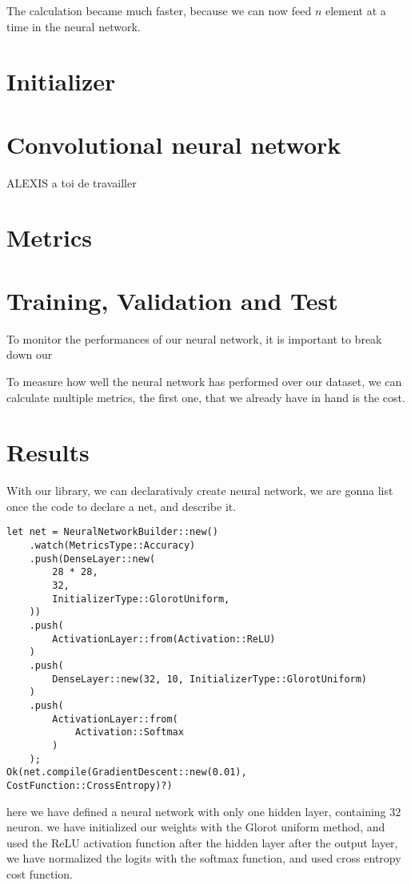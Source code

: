 \documentclass[a4paper, twocolumn, twoside]{article}
\begin{document}
	The calculation became much faster, because we can now feed $n$ element at a time in the neural network.

	\section{Initializer}
	
	\section{Convolutional neural network}
	ALEXIS a toi de travailler

	\section{Metrics}
	
	\section{Training, Validation and Test}
	To monitor the performances of our neural network, it is important to break down our 

	To measure how well the neural network has performed over our dataset, we can calculate multiple metrics, the first one, that we already have in hand
	is the cost.

	\section{Results}
	With our library, we can declarativaly create neural network, we are gonna list once the code to declare a net, and describe it.

	\begin{verbatim}
let net = NeuralNetworkBuilder::new()
	.watch(MetricsType::Accuracy)
	.push(DenseLayer::new(
		28 * 28,
		32,
		InitializerType::GlorotUniform,
	))
	.push(
		ActivationLayer::from(Activation::ReLU)
	)
	.push(
		DenseLayer::new(32, 10, InitializerType::GlorotUniform)
	)
	.push(
		ActivationLayer::from(
			Activation::Softmax
		)
	);
Ok(net.compile(GradientDescent::new(0.01), CostFunction::CrossEntropy)?)
	\end{verbatim}

	here we have defined a neural network with only one hidden layer, containing 32 neuron.
	we have initialized our weights with the Glorot uniform method, and used the ReLU activation function after the hidden layer
	after the output layer, we have normalized the logits with the softmax function, and used cross entropy cost function.
\end{document}
